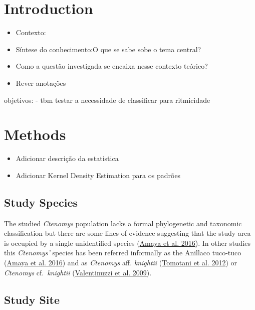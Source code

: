 \documentclass[english,msc,numbers,hidelinks]{coppe}
\providecommand{\tightlist}{%
  \setlength{\itemsep}{0pt}\setlength{\parskip}{0pt}}
\begin{document}
  \hypertarget{introduction}{%
  \section{Introduction}\label{introduction}}
  \begin{itemize}
  \tightlist
  \item
    Contexto:
  \item
    Síntese do conhecimento:O que se sabe sobe o tema central?
  \item
    Como a questão investigada se encaixa nesse contexto teórico?
  \item
    Rever anotações
  \end{itemize}
  objetivos: - tbm testar a necessidade de classificar para ritmicidade

  \hypertarget{methods}{%
  \section{Methods}\label{methods}}
  \begin{itemize}
  \tightlist
  \item
    Adicionar descrição da estatistica
  \item
    Adicionar Kernel Density Estimation para os padrões
  \end{itemize}
  \hypertarget{study-species}{%
  \subsection{Study Species}\label{study-species}}

  The studied \emph{Ctenomys} population lacks a formal phylogenetic and taxonomic classification but there are some lines of evidence suggesting that the study area is occupied by a single unidentified species (\protect\hyperlink{ref-amaya2016}{Amaya et al. 2016}). In other studies this \emph{Ctenomys'} species has been referred informally as the Anillaco tuco-tuco (\protect\hyperlink{ref-amaya2016}{Amaya et al. 2016}) and as \emph{Ctenomys} aff. \emph{knightii} (\protect\hyperlink{ref-tomotani2012}{Tomotani et al. 2012}) or \emph{Ctenomys} cf.~\emph{knightii} (\protect\hyperlink{ref-valentinuzzi2009}{Valentinuzzi et al. 2009}).

  \hypertarget{study-site}{%
  \subsection{Study Site}\label{study-site}}
\end{document}
